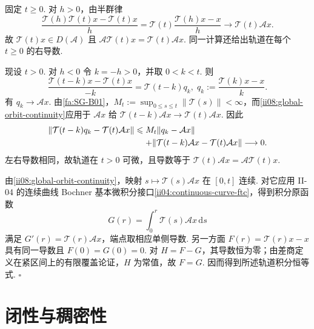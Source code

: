 \begin{FAProof}
固定 \(\displaystyle t\geqslant0\). 对 \(\displaystyle h>0\)，由半群律
\[
\frac{\mathcal T(h)\mathcal T(t)x-\mathcal T(t)x}{h}
=
\mathcal T(t)\frac{\mathcal T(h)x-x}{h}
\longrightarrow
\mathcal T(t)\mathcal Ax.
\]
故 \(\displaystyle\mathcal T(t)x\in D(\mathcal A)\) 且 \(\displaystyle\mathcal A\mathcal T(t)x=\mathcal T(t)\mathcal Ax\). 同一计算还给出轨道在每个 \(\displaystyle t\geqslant0\) 的右导数.

现设 \(\displaystyle t>0\). 对 \(\displaystyle h<0\) 令 \(\displaystyle k=-h>0\)，并取 \(\displaystyle0<k<t\). 则
\[
\frac{\mathcal T(t-k)x-\mathcal T(t)x}{-k}
=
\mathcal T(t-k)q_k,
\;
q_k:=\frac{\mathcal T(k)x-x}{k}.
\]
有 \(\displaystyle q_k\to\mathcal Ax\). 由\autoref{fa:SG-B01}，\(\displaystyle M_t:=\sup_{0\leqslant s\leqslant t}\|\mathcal T(s)\|<\infty\)，而\autoref{ii08:global-orbit-continuity}应用于 \(\displaystyle\mathcal Ax\) 给 \(\displaystyle\mathcal T(t-k)\mathcal Ax\to\mathcal T(t)\mathcal Ax\). 因此
\[
\begin{aligned}
\displaystyle \|\mathcal T(t-k)q_k-\mathcal T(t)\mathcal Ax\| &\displaystyle \leqslant M_t\|q_k-\mathcal Ax\|\\
\displaystyle &\displaystyle \mathrel{\phantom{\leqslant}}+ \|\mathcal T(t-k)\mathcal Ax-\mathcal T(t)\mathcal Ax\| \longrightarrow0.
\end{aligned}
\]
左右导数相同，故轨道在 \(\displaystyle t>0\) 可微，且导数等于 \(\displaystyle\mathcal T(t)\mathcal Ax=\mathcal A\mathcal T(t)x\).

由\autoref{ii08:global-orbit-continuity}，映射 \(\displaystyle s\mapsto\mathcal T(s)\mathcal Ax\) 在 \(\displaystyle[0,t]\) 连续. 对它应用 II-04 的连续曲线 Bochner 基本微积分接口\autoref{ii04:continuous-curve-ftc}，得到积分原函数
\[
G(r)=\int_0^r\mathcal T(s)\mathcal Ax\,\mathrm{d}s
\]
满足 \(\displaystyle G'(r)=\mathcal T(r)\mathcal Ax\)，端点取相应单侧导数. 另一方面 \(\displaystyle F(r)=\mathcal T(r)x-x\) 具有同一导数且 \(\displaystyle F(0)=G(0)=0\). 对 \(\displaystyle H=F-G\)，其导数恒为零；由差商定义在紧区间上的有限覆盖论证，\(\displaystyle H\) 为常值，故 \(\displaystyle F=G\). 因而得到所述轨道积分恒等式.
\hfill\(\square\)
\end{FAProof}

\section{闭性与稠密性}\label{sec:ii08-closed-dense}

